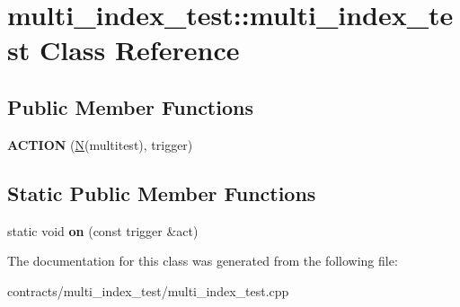 \hypertarget{classmulti__index__test_1_1multi__index__test}{}\section{multi\+\_\+index\+\_\+test\+:\+:multi\+\_\+index\+\_\+test Class Reference}
\label{classmulti__index__test_1_1multi__index__test}
\subsection*{Public Member Functions}
\begin{DoxyCompactItemize}
\item 
\mbox{\label{classmulti__index__test_1_1multi__index__test_afe8e17a69948116559eb0e0305e3e08c}} 
{\bfseries A\+C\+T\+I\+ON} (\mbox{\hyperlink{group__types_gaf9c1edb0e0da55ec6ba09f32f6839529}{N}}(multitest), trigger)
\end{DoxyCompactItemize}
\subsection*{Static Public Member Functions}
\begin{DoxyCompactItemize}
\item 
\mbox{\label{classmulti__index__test_1_1multi__index__test_a1057b7bc88d69e194da43d8f5f7dae21}} 
static void {\bfseries on} (const trigger \&act)
\end{DoxyCompactItemize}


The documentation for this class was generated from the following file\+:\begin{DoxyCompactItemize}
\item 
contracts/multi\+\_\+index\+\_\+test/multi\+\_\+index\+\_\+test.\+cpp\end{DoxyCompactItemize}
